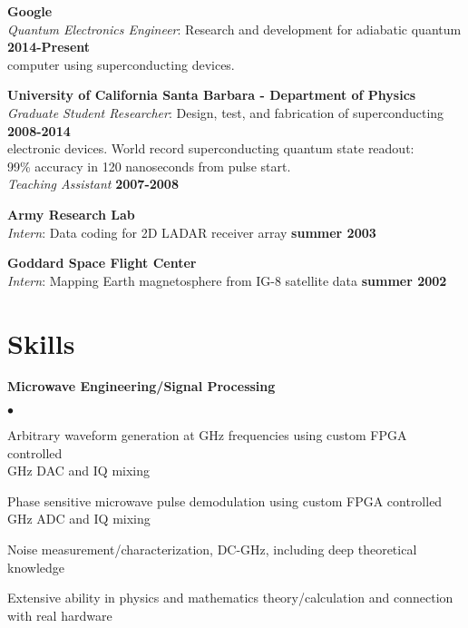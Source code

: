 \documentclass[margin=2cm,line]{res}
\newenvironment{list4}{
  \begin{list}{$\bullet$}{%
      \setlength{\itemsep}{0in}
      \setlength{\parsep}{0in} \setlength{\parskip}{0in}
      \setlength{\topsep}{0in} \setlength{\partopsep}{0in}
      \setlength{\leftmargin}{0.2in}}}{\end{list}}
\begin{document}
\begin{resume}
{\bf Google}\\
{\em Quantum Electronics Engineer}: Research and development for adiabatic quantum \hfill {\bf 2014-Present}\\
computer using superconducting devices.

{\bf University of California Santa Barbara - Department of Physics}\\
{\em Graduate Student Researcher}: Design, test, and fabrication of superconducting \hfill {\bf 2008-2014}\\
electronic devices. World record superconducting quantum state readout: \\
99\% accuracy in 120 nanoseconds from pulse start.\\
{\em Teaching Assistant} \hfill {\bf 2007-2008}

{\bf Army Research Lab}\\
{\em Intern}: Data coding for 2D LADAR receiver array \hfill {\bf summer 2003}

{\bf Goddard Space Flight Center}\\
{\em Intern}: Mapping Earth magnetosphere from IG-8 satellite data \hfill {\bf summer 2002}


\section{\sc Skills}

{\bf Microwave Engineering/Signal Processing}\\
\vspace*{-.15in}
\begin{list4}
\item Arbitrary waveform generation at GHz frequencies using custom FPGA controlled\\
GHz DAC and IQ mixing
\item Phase sensitive microwave pulse demodulation using custom FPGA controlled\\
GHz ADC and IQ mixing
\item Noise measurement/characterization, DC-GHz, including deep theoretical knowledge
\item Extensive ability in physics and mathematics theory/calculation and connection\\ with real hardware
\end{list4}


\end{resume}
\end{document}
